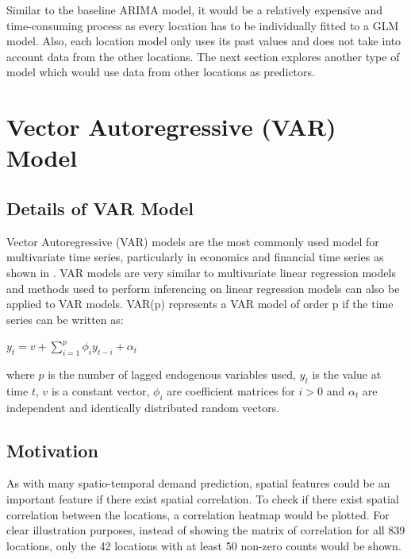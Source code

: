 \documentclass[12pt, letterpaper] {article}
\begin{document}
Similar to the baseline ARIMA model, it would be a relatively expensive and time-consuming process as every location has to be individually fitted to a GLM model. Also, each location model only uses its past values and does not take into account data from the other locations. The next section explores another type of model which would use data from other locations as predictors. 


\section{Vector Autoregressive (VAR) Model}

\subsection{Details of VAR Model}
Vector Autoregressive (VAR) models are the most commonly used model for multivariate time series, particularly in economics and financial time series as shown in \cite{Hilde2000}. VAR models are very similar to multivariate linear regression models and methods used to perform inferencing on linear regression models can also be applied to VAR models. VAR(p) represents a VAR model of order p if the time series can be written as: 

\begin{center}
    $\displaystyle y_t=v+\sum_{i=1}^{p} \phi_{i}y_{t-i}+\alpha_t$
\end{center}

\noindent where $p$ is the number of lagged endogenous variables used, $y_t$ is the value at time $t$, $v$ is a constant vector, $\phi_i$ are coefficient matrices for $i>0$ and $\alpha_t$ are independent and identically distributed random vectors. 

\subsection{Motivation}

As with many spatio-temporal demand prediction, spatial features could be an important feature if there exist spatial correlation. To check if there exist spatial correlation between the locations, a correlation heatmap would be plotted. For clear illustration purposes, instead of showing the matrix of correlation for all 839 locations, only the 42 locations with at least 50 non-zero counts would be shown. 
\end{document}
